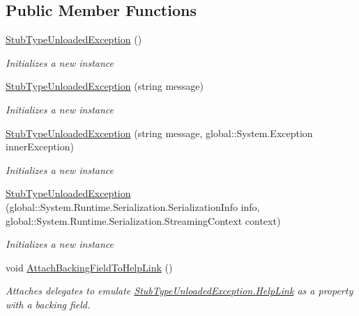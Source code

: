 \subsection*{Public Member Functions}
\begin{DoxyCompactItemize}
\item 
\hyperlink{class_system_1_1_fakes_1_1_stub_type_unloaded_exception_affec8665a6310b9449998b15c091be67}{Stub\-Type\-Unloaded\-Exception} ()
\begin{DoxyCompactList}\small\item\em Initializes a new instance\end{DoxyCompactList}\item 
\hyperlink{class_system_1_1_fakes_1_1_stub_type_unloaded_exception_a0a7b5dd77bc8a1830f0e15b73d53fc70}{Stub\-Type\-Unloaded\-Exception} (string message)
\begin{DoxyCompactList}\small\item\em Initializes a new instance\end{DoxyCompactList}\item 
\hyperlink{class_system_1_1_fakes_1_1_stub_type_unloaded_exception_a99f2110c55bcfcf49c8e20303e74f1cf}{Stub\-Type\-Unloaded\-Exception} (string message, global\-::\-System.\-Exception inner\-Exception)
\begin{DoxyCompactList}\small\item\em Initializes a new instance\end{DoxyCompactList}\item 
\hyperlink{class_system_1_1_fakes_1_1_stub_type_unloaded_exception_a2e8b96b9facbf6407ca9a0ec29b45638}{Stub\-Type\-Unloaded\-Exception} (global\-::\-System.\-Runtime.\-Serialization.\-Serialization\-Info info, global\-::\-System.\-Runtime.\-Serialization.\-Streaming\-Context context)
\begin{DoxyCompactList}\small\item\em Initializes a new instance\end{DoxyCompactList}\item 
void \hyperlink{class_system_1_1_fakes_1_1_stub_type_unloaded_exception_a7eb2f5f6e867c91f3eb3f9db5f336aa0}{Attach\-Backing\-Field\-To\-Help\-Link} ()
\begin{DoxyCompactList}\small\item\em Attaches delegates to emulate \hyperlink{class_system_1_1_fakes_1_1_stub_type_unloaded_exception_a13303f8275b07e28f2379a5c435e0a9c}{Stub\-Type\-Unloaded\-Exception.\-Help\-Link} as a property with a backing field.\end{DoxyCompactList}\item 

\end{DoxyCompactItemize}
